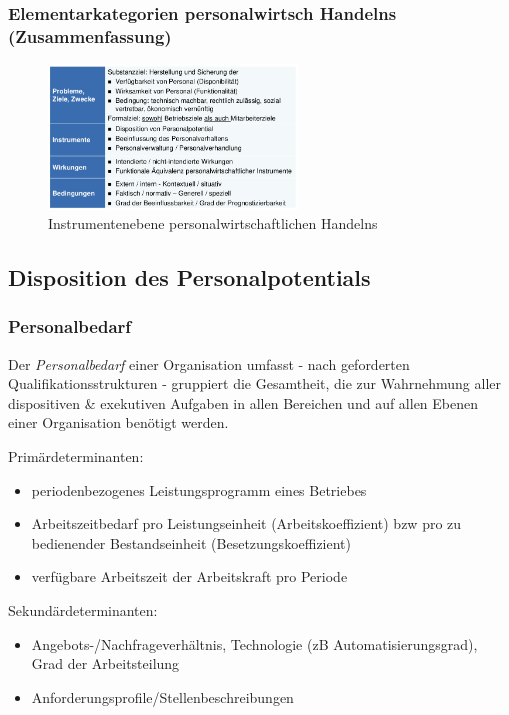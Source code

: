 \documentclass[11pt]{article}
\begin{document}
\subsubsection{Elementarkategorien personalwirtsch Handelns (Zusammenfassung)}
\label{sec:org7cff8dd}
\begin{figure}[htbp]
\centering
\includegraphics[width=250px]{./pictures/perskateg.png}
\caption{Instrumentenebene personalwirtschaftlichen Handelns}
\end{figure} 

\subsection{Disposition des Personalpotentials}
\label{sec:orgceca750}
\subsubsection{Personalbedarf}
\label{sec:orgf4533a2}
Der \emph{Personalbedarf} einer Organisation umfasst - nach geforderten Qualifikationsstrukturen - gruppiert die Gesamtheit, die zur Wahrnehmung aller dispositiven \& exekutiven Aufgaben in allen Bereichen und auf allen Ebenen einer Organisation benötigt werden.

Primärdeterminanten:
\begin{itemize}
\item periodenbezogenes Leistungsprogramm eines Betriebes
\item Arbeitszeitbedarf pro Leistungseinheit (Arbeitskoeffizient) bzw pro zu bedienender Bestandseinheit (Besetzungskoeffizient)
\item verfügbare Arbeitszeit der Arbeitskraft pro Periode
\end{itemize}

Sekundärdeterminanten:
\begin{itemize}
\item Angebots-/Nachfrageverhältnis, Technologie (zB Automatisierungsgrad), Grad der Arbeitsteilung
\item Anforderungsprofile/Stellenbeschreibungen
\end{itemize}
\end{document}
